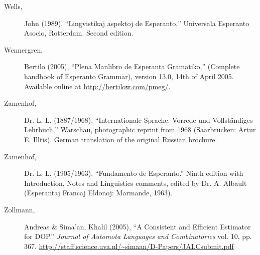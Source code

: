 \documentclass[10pt,a4paper]{article}
\begin{document}
\begin{description}
\item[Wells,] John (1989), ``Lingvistikaj aspektoj de Esperanto,'' Universala
Esperanto Asocio, Rotterdam. Second edition.

\item[Wennergren,] Bertilo (2005), ``Plena Manlibro de Esperanta Gramatiko,''
(Complete handbook of Esperanto Grammar), version 13.0, 14th of April 2005.
Available online at \url{http://bertilow.com/pmeg/}.

\item[Zamenhof,] Dr. L. L. (1887/1968), ``Internationale Sprache. Vorrede und
Vollst\"andiges Lehrbuch,'' Warschau, photographic reprint from 1968
(Saarbr\"ucken: Artur E. Illtis). German translation of the original Russian
brochure.

\item[Zamenhof,] Dr. L. L. (1905/1963), ``Fundamento de Esperanto.'' Ninth
edition with Introduction, Notes and Linguistics comments, edited by Dr. A.
Albault (Esperantaj Francaj Eldonoj: Marmande, 1963).

\item[Zollmann,] Andreas \& Sima'an, Khalil (2005), ``A Consistent and Efficient
Estimator for DOP.''  {\em Journal of Automota Languages and Combinatorics} vol.
10, pp. 367.  \url{http://staff.science.uva.nl/~simaan/D-Papers/JALCsubmit.pdf}

\end{description}
\end{document}

